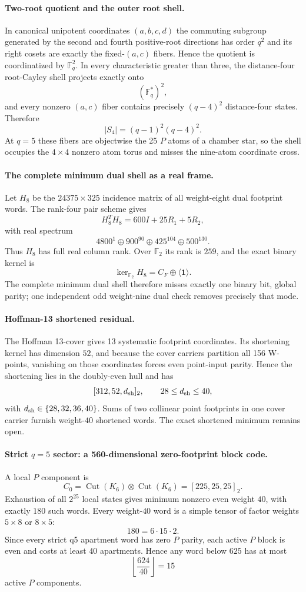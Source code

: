 \paragraph{Two-root quotient and the outer root shell.}
In canonical unipotent coordinates $(a,b,c,d)$ the commuting subgroup generated by the second and fourth positive-root directions has order $q^2$ and its right cosets are exactly the fixed-$(a,c)$ fibers.  Hence the quotient is coordinatized by $\mathbb F_q^2$.  In every characteristic greater than three, the distance-four root-Cayley shell projects exactly onto
\[
 (\mathbb F_q^*)^2,
\]
and every nonzero $(a,c)$ fiber contains precisely $(q-4)^2$ distance-four states.  Therefore
\[
 |S_4|=(q-1)^2(q-4)^2.
\]
At $q=5$ these fibers are objectwise the 25 $P$ atoms of a chamber star, so the shell occupies the $4\times4$ nonzero atom torus and misses the nine-atom coordinate cross.

\paragraph{The complete minimum dual shell as a real frame.}
Let $H_8$ be the $24375\times325$ incidence matrix of all weight-eight dual footprint words.  The rank-four pair scheme gives
\[
 H_8^TH_8=600I+25R_1+5R_2,
\]
with real spectrum
\[
 4800^1\oplus900^{90}\oplus425^{104}\oplus500^{130}.
\]
Thus $H_8$ has full real column rank.  Over $\mathbb F_2$ its rank is $259$, and the exact binary kernel is
\[
 \boxed{\ker_{\mathbb F_2}H_8=C_F\oplus\langle\mathbf1\rangle.}
\]
The complete minimum dual shell therefore misses exactly one binary bit, global parity; one independent odd weight-nine dual check removes precisely that mode.

\paragraph{Hoffman-13 shortened residual.}
The Hoffman 13-cover gives 13 systematic footprint coordinates.  Its shortening kernel has dimension $52$, and because the cover carriers partition all 156 W-points, vanishing on those coordinates forces even point-input parity.  Hence the shortening lies in the doubly-even hull and has
\[
 [312,52,d_{\rm sh}]_2,
 \qquad 28\le d_{\rm sh}\le40,
\]
with $d_{\rm sh}\in\{28,32,36,40\}$.  Sums of two collinear point footprints in one cover carrier furnish weight-$40$ shortened words.  The exact shortened minimum remains open.

\paragraph{Strict $q=5$ sector: a 560-dimensional zero-footprint block code.}
A local $P$ component is
\[
 C_0=\operatorname{Cut}(K_6)\otimes\operatorname{Cut}(K_6)=[225,25,25]_2.
\]
Exhaustion of all $2^{25}$ local states gives minimum nonzero even weight $40$, with exactly $180$ such words.  Every weight-$40$ word is a simple tensor of factor weights $5\times8$ or $8\times5$:
\[
 180=6\cdot15\cdot2.
\]
Since every strict q5 apartment word has zero $P$ parity, each active $P$ block is even and costs at least $40$ apartments.  Hence any word below $625$ has at most
\[
 \left\lfloor\frac{624}{40}\right\rfloor=15
\]
active $P$ components.

